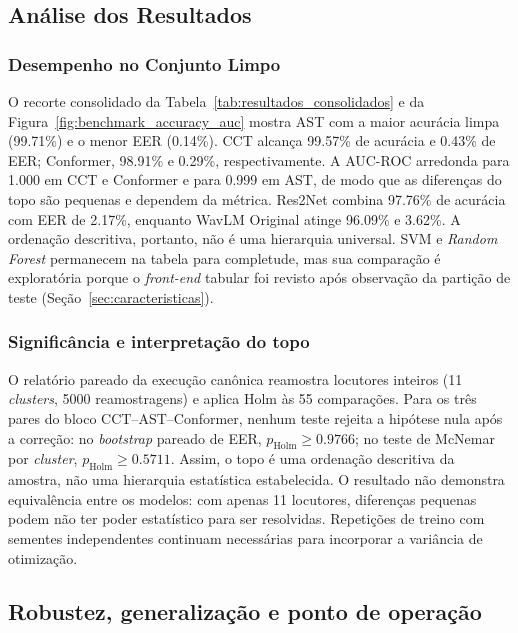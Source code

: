 \documentclass[12pt,a4paper]{article}
\begin{document}
\subsection{Análise dos Resultados}
\label{sec:analise_resultados}

\subsubsection{Desempenho no Conjunto Limpo}

O recorte consolidado da Tabela~\ref{tab:resultados_consolidados} e da
Figura~\ref{fig:benchmark_accuracy_auc} mostra AST com a maior acurácia limpa
(\num{99,71}\%) e o menor EER (\num{0,14}\%). CCT alcança
\num{99,57}\% de acurácia e \num{0,43}\% de EER; Conformer,
\num{98,91}\% e \num{0,29}\%, respectivamente. A AUC-ROC arredonda para
\num{1,000} em CCT e Conformer e para \num{0,999} em AST, de modo que as
diferenças do topo são pequenas e dependem da métrica. Res2Net combina
\num{97,76}\% de acurácia com EER de \num{2,17}\%, enquanto WavLM Original
atinge \num{96,09}\% e \num{3,62}\%. A ordenação descritiva, portanto, não é
uma hierarquia universal. SVM e \textit{Random Forest} permanecem na tabela para
completude, mas sua comparação é exploratória porque o \textit{front-end}
tabular foi revisto após observação da partição de teste
(Seção~\ref{sec:caracteristicas}).

\subsubsection{Significância e interpretação do topo}

O relatório pareado da execução canônica reamostra locutores inteiros
(\num{11} \textit{clusters}, \num{5000} reamostragens) e aplica Holm às
\num{55} comparações. Para os três pares do bloco CCT--AST--Conformer, nenhum
teste rejeita a hipótese nula após a correção: no \textit{bootstrap} pareado
de EER, $p_{\mathrm{Holm}} \geq \num{0,9766}$; no teste de McNemar por
\textit{cluster}, $p_{\mathrm{Holm}} \geq \num{0,5711}$. Assim, o topo é uma
ordenação descritiva da amostra, não uma hierarquia estatística estabelecida.
O resultado não demonstra equivalência entre os modelos: com apenas \num{11}
locutores, diferenças pequenas podem não ter poder estatístico para ser
resolvidas. Repetições de treino com sementes independentes continuam
necessárias para incorporar a variância de otimização.

\subsection{Robustez, generalização e ponto de operação}
\label{sec:robustez}
\end{document}
